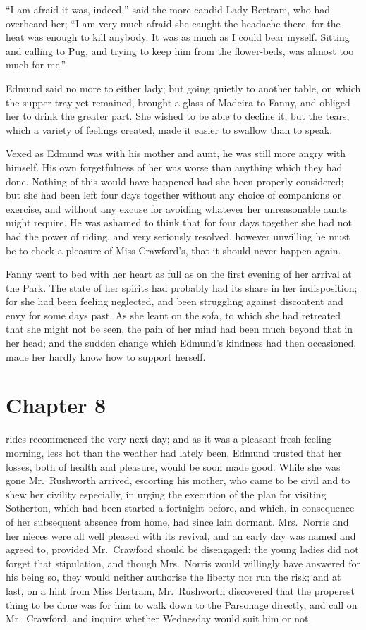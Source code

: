 ``I am afraid it was, indeed,'' said the more candid
Lady Bertram, who had overheard her; ``I am very much afraid
she caught the headache there, for the heat was enough
to kill anybody.  It was as much as I could bear myself.
Sitting and calling to Pug, and trying to keep him from
the flower-beds, was almost too much for me.''

Edmund said no more to either lady; but going quietly
to another table, on which the supper-tray yet remained,
brought a glass of Madeira to Fanny, and obliged her to drink
the greater part.  She wished to be able to decline it;
but the tears, which a variety of feelings created,
made it easier to swallow than to speak.

Vexed as Edmund was with his mother and aunt, he was still
more angry with himself.  His own forgetfulness of her was
worse than anything which they had done.  Nothing of this
would have happened had she been properly considered;
but she had been left four days together without any choice
of companions or exercise, and without any excuse for
avoiding whatever her unreasonable aunts might require.
He was ashamed to think that for four days together she had
not had the power of riding, and very seriously resolved,
however unwilling he must be to check a pleasure of Miss
Crawford's, that it should never happen again.

Fanny went to bed with her heart as full as on the first
evening of her arrival at the Park.  The state of her
spirits had probably had its share in her indisposition;
for she had been feeling neglected, and been struggling
against discontent and envy for some days past.
As she leant on the sofa, to which she had retreated
that she might not be seen, the pain of her mind
had been much beyond that in her head; and the sudden
change which Edmund's kindness had then occasioned,
made her hardly know how to support herself.



\chapter{Chapter 8}

 rides recommenced the very next day; and as it
was a pleasant fresh-feeling morning, less hot than the
weather had lately been, Edmund trusted that her losses,
both of health and pleasure, would be soon made good.
While she was gone Mr.\ Rushworth arrived, escorting his mother,
who came to be civil and to shew her civility especially,
in urging the execution of the plan for visiting Sotherton,
which had been started a fortnight before, and which,
in consequence of her subsequent absence from home,
had since lain dormant.  Mrs.\ Norris and her nieces were all
well pleased with its revival, and an early day was named
and agreed to, provided Mr.\ Crawford should be disengaged:
the young ladies did not forget that stipulation, and though
Mrs.\ Norris would willingly have answered for his being so,
they would neither authorise the liberty nor run the risk;
and at last, on a hint from Miss Bertram, Mr.\ Rushworth
discovered that the properest thing to be done was for
him to walk down to the Parsonage directly, and call on
Mr.\ Crawford, and inquire whether Wednesday would suit him
or not.


